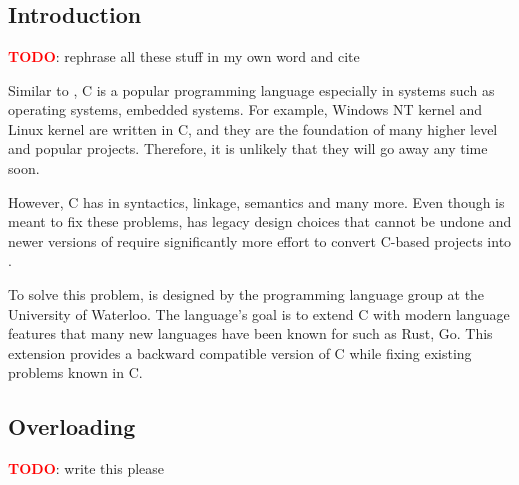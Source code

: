 \chapter{\CFA} \label{CFA}
\section{Introduction}
\textbf{\textcolor{red}{TODO}}: rephrase all these stuff in my own word and cite

Similar to \CC, C is a popular programming language especially in systems such
as operating systems, embedded systems. For example, Windows NT kernel and
Linux kernel are written in C, and they are the foundation of many higher level
and popular projects. Therefore, it is unlikely that they will go away any time soon.

However, C has in syntactics, linkage, semantics and many
more. Even though \CCS is meant to fix these problems, \CCS has legacy design
choices that cannot be undone and newer versions of \CCS require significantly
more effort to convert C-based projects into \CCS.

To solve this problem, \CFAS is designed by the programming language group at the
University of Waterloo. The language's goal is to extend C with modern language
features that many new languages have been known for such as Rust, Go. This
extension provides a backward compatible version of C while fixing existing
problems known in C.

\section{Overloading}
\textbf{\textcolor{red}{TODO}}: write this please
